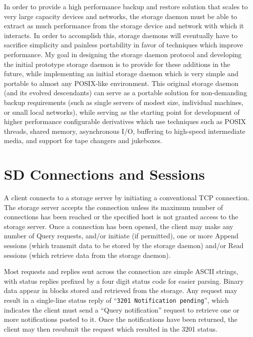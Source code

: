 In order to provide a high performance backup and restore solution that scales
to very large capacity devices and networks, the storage daemon must be able
to extract as much performance from the storage device and network with which
it interacts. In order to accomplish this, storage daemons will eventually
have to sacrifice simplicity and painless portability in favor of techniques
which improve performance. My goal in designing the storage daemon protocol
and developing the initial prototype storage daemon is to provide for these
additions in the future, while implementing an initial storage daemon which is
very simple and portable to almost any POSIX-like environment. This original
storage daemon (and its evolved descendants) can serve as a portable solution
for non-demanding backup requirements (such as single servers of modest size,
individual machines, or small local networks), while serving as the starting
point for development of higher performance configurable derivatives which use
techniques such as POSIX threads, shared memory, asynchronous I/O, buffering
to high-speed intermediate media, and support for tape changers and jukeboxes.


\section{SD Connections and Sessions}

A client connects to a storage server by initiating a conventional TCP
connection. The storage server accepts the connection unless its maximum
number of connections has been reached or the specified host is not granted
access to the storage server. Once a connection has been opened, the client
may make any number of Query requests, and/or initiate (if permitted), one or
more Append sessions (which transmit data to be stored by the storage daemon)
and/or Read sessions (which retrieve data from the storage daemon).

Most requests and replies sent across the connection are simple ASCII strings,
with status replies prefixed by a four digit status code for easier parsing.
Binary data appear in blocks stored and retrieved from the storage. Any
request may result in a single-line status reply of ``{\tt 3201\ Notification\
pending}'', which indicates the client must send a ``Query notification''
request to retrieve one or more notifications posted to it. Once the
notifications have been returned, the client may then resubmit the request
which resulted in the 3201 status.

